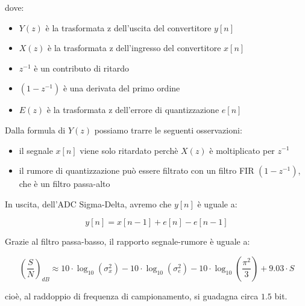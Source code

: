 dove: 

\begin{itemize}
    \item $Y \left(z\right)$ è la trasformata z dell'uscita del convertitore $y \left[ n\right]$ 
    \item $X \left(z\right)$ è la trasformata z dell'ingresso del convertitore $x \left[ n\right]$
    \item $z^{-1}$ è un contributo di ritardo 
    \item $\left(1 - z^{-1}\right)$ è una derivata del primo ordine 
    \item $E \left(z\right)$ è la trasformata z dell'errore di quantizzazione $e \left[ n\right]$ 
\end{itemize}

Dalla formula di $Y \left(z\right)$ possiamo trarre le seguenti osservazioni: 

\begin{itemize}
    \item il segnale $x \left[ n\right]$ viene solo ritardato perchè $X \left(z\right)$ è moltiplicato per $z^{-1}$
    \item il rumore di quantizzazione può essere filtrato con un filtro FIR $\left(1 - z^{-1}\right)$, che è un filtro passa-alto 
\end{itemize}

\newpage 

In uscita, dell'ADC Sigma-Delta, avremo che $y \left[ n\right]$ è uguale a: 

{
    \Large 
    \begin{equation}
        y \left[ n\right]
        = 
        x \left[ n - 1\right]
        + 
        e \left[ n\right]
        - 
        e \left[ n - 1\right]
    \end{equation}
}

Grazie al filtro passa-basso, il rapporto segnale-rumore è uguale a: 

{
    \Large 
    \begin{equation}
        \left(\dfrac{S}{N}\right)_{dB}
        \approx 
        10 \cdot \log_{10} \left(\sigma_{x}^{2}\right)
        - 
        10 \cdot \log_{10} \left(\sigma_{e}^{2}\right)
        -
        10 \cdot \log_{10} \left(\dfrac{\pi^{2}}{3}\right) 
        +
        9.03 \cdot S
    \end{equation}
}

cioè, al raddoppio di frequenza di campionamento, si guadagna circa $1.5$ bit. \newline 

